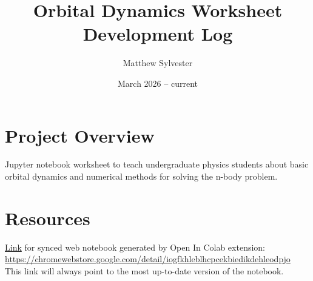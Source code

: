 \documentclass{article}
\title{Orbital Dynamics Worksheet Development Log}
\author{Matthew Sylvester}
\date{March 2026 -- current}
\begin{document}
\maketitle

\section{Project Overview}

Jupyter notebook worksheet to teach undergraduate physics students about basic orbital dynamics and numerical methods for solving the n-body problem.

\section{Resources}

\href{https://colab.research.google.com/github/fourthstanza/orbital-dynamics-worksheet/blob/main/Orbital_Dynamics_Worksheet.ipynb}{Link} for synced web notebook generated by Open In Colab extension: \url{https://chromewebstore.google.com/detail/iogfkhleblhcpcekbiedikdehleodpjo}\\
This link will always point to the most up-to-date version of the notebook.
\end{document}
